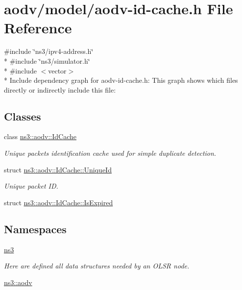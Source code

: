 \hypertarget{aodv-id-cache_8h}{}\section{aodv/model/aodv-\/id-\/cache.h File Reference}
\label{aodv-id-cache_8h}
{\ttfamily \#include \char`\"{}ns3/ipv4-\/address.\+h\char`\"{}}\\*
{\ttfamily \#include \char`\"{}ns3/simulator.\+h\char`\"{}}\\*
{\ttfamily \#include $<$vector$>$}\\*
Include dependency graph for aodv-\/id-\/cache.h\+:
This graph shows which files directly or indirectly include this file\+:
\subsection*{Classes}
\begin{DoxyCompactItemize}
\item 
class \hyperlink{classns3_1_1aodv_1_1IdCache}{ns3\+::aodv\+::\+Id\+Cache}
\begin{DoxyCompactList}\small\item\em Unique packets identification cache used for simple duplicate detection. \end{DoxyCompactList}\item 
struct \hyperlink{structns3_1_1aodv_1_1IdCache_1_1UniqueId}{ns3\+::aodv\+::\+Id\+Cache\+::\+Unique\+Id}
\begin{DoxyCompactList}\small\item\em Unique packet ID. \end{DoxyCompactList}\item 
struct \hyperlink{structns3_1_1aodv_1_1IdCache_1_1IsExpired}{ns3\+::aodv\+::\+Id\+Cache\+::\+Is\+Expired}
\end{DoxyCompactItemize}
\subsection*{Namespaces}
\begin{DoxyCompactItemize}
\item 
 \hyperlink{namespacens3}{ns3}
\begin{DoxyCompactList}\small\item\em Here are defined all data structures needed by an O\+L\+SR node. \end{DoxyCompactList}\item 
 \hyperlink{namespacens3_1_1aodv}{ns3\+::aodv}
\end{DoxyCompactItemize}

